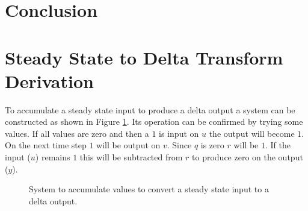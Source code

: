 \documentclass{article}
\begin{document}

\clearpage
\section{Conclusion}


\clearpage
\appendix

\clearpage
\section{Steady State to Delta Transform Derivation}
\label{app:cdelta}

To accumulate a steady state input to produce a delta output
a system can be constructed as shown in Figure \ref{fig:cd1}.
Its operation can be confirmed by trying some values.
If all values are zero and then a $1$ is input on $u$ the
output will become $1$.
On the next time step $1$ will be output on $v$.
Since $q$ is zero $r$ will be $1$.
If the input ($u$) remains $1$ this will be subtracted from $r$
to produce zero on the output ($y$).

\begin{figure}[hpb!]
\begin{center}


\end{center}

\caption{System to accumulate values to convert a steady state
input to a delta output.}
\label{fig:cd1}
\end{figure}
\end{document}

